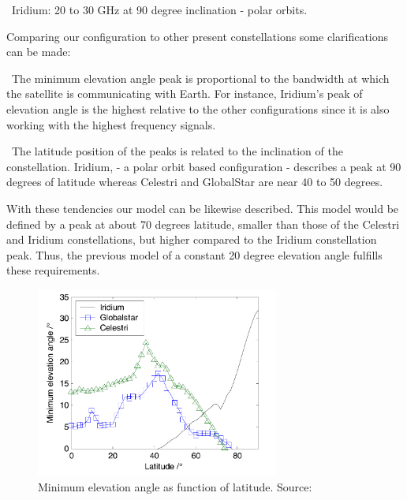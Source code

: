 \textendash\ Iridium: 20 to 30 GHz at 90 degree inclination - polar orbits.

Comparing our configuration to other present constellations some clarifications can be made: 

\textendash\ The minimum elevation angle peak is proportional to the bandwidth at which the satellite is communicating with Earth. For instance, Iridium's peak of elevation angle is the highest relative to the other configurations since it is also working with the highest frequency signals.

\textendash\ The latitude position of the peaks is related to the inclination of the constellation. Iridium, - a polar orbit based configuration - describes a peak at 90 degrees of latitude whereas Celestri and GlobalStar are near 40 to 50 degrees.

With these tendencies our model can be likewise described. This model would be defined by a peak at about 70 degrees latitude, smaller than those of the Celestri and Iridium constellations, but higher compared to the Iridium constellation peak. Thus, the previous model of a constant 20 degree elevation angle fulfills these requirements. 

\begin{figure}[h]
\includegraphics[width=8cm]{latitudes}
\centering
\caption{Minimum elevation angle as function of latitude. Source: \cite{Li2016}}
\end{figure}